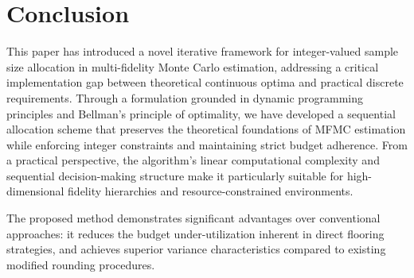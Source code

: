 \section{Conclusion}
This paper has introduced a novel iterative framework for integer-valued sample size allocation in multi-fidelity Monte Carlo estimation, addressing a critical implementation gap between theoretical continuous optima and practical discrete requirements. Through a formulation grounded in dynamic programming principles and Bellman's principle of optimality, we have developed a sequential allocation scheme that preserves the theoretical foundations of MFMC estimation while enforcing integer constraints and maintaining strict budget adherence. From a practical perspective, the algorithm's linear computational complexity and sequential decision-making structure make it particularly suitable for high-dimensional fidelity hierarchies and resource-constrained environments. 

The proposed method demonstrates significant advantages over conventional approaches: it reduces the budget under-utilization inherent in direct flooring strategies, and achieves superior variance characteristics compared to existing modified rounding procedures. 

